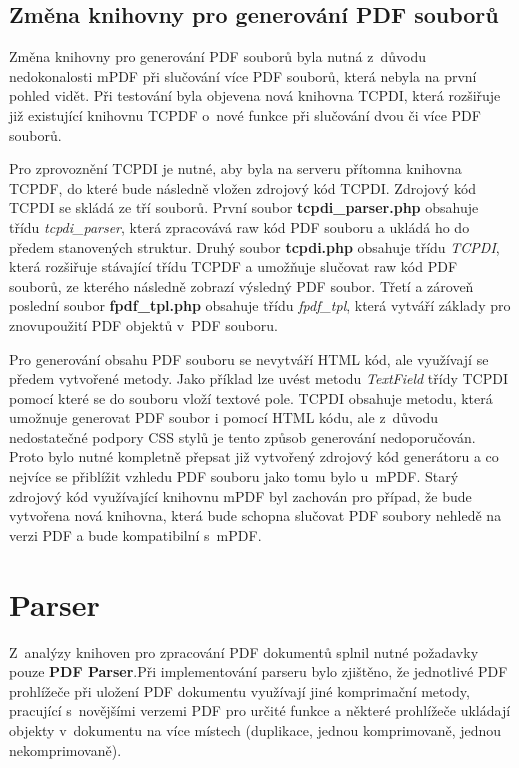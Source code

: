 \subsection{Změna knihovny pro generování PDF souborů}
Změna knihovny pro generování PDF souborů byla nutná z~důvodu nedokonalosti mPDF při slučování více PDF souborů, která nebyla na první pohled vidět. Při testování byla objevena nová knihovna TCPDI, která rozšiřuje již existující knihovnu TCPDF o~nové funkce při slučování dvou či více PDF souborů. 
\par
Pro zprovoznění TCPDI je nutné, aby byla na serveru přítomna knihovna TCPDF, do které bude následně vložen zdrojový kód TCPDI. Zdrojový kód TCPDI se skládá ze tří souborů. První soubor \textbf{tcpdi\_parser.php} obsahuje třídu \textit{tcpdi\_parser}, která zpracovává raw kód PDF souboru a ukládá ho do předem stanovených struktur. Druhý soubor \textbf{tcpdi.php} obsahuje třídu \textit{TCPDI}, která rozšiřuje stávající třídu TCPDF a umožňuje slučovat raw kód PDF souborů, ze kterého následně zobrazí výsledný PDF soubor. Třetí a zároveň poslední soubor \textbf{fpdf\_tpl.php} obsahuje třídu \textit{fpdf\_tpl}, která vytváří základy pro znovupoužití PDF objektů v~PDF souboru.
\par
Pro generování obsahu PDF souboru se nevytváří HTML kód, ale využívají se předem vytvořené metody. Jako příklad lze uvést metodu \textit{TextField} třídy TCPDI pomocí které se do souboru vloží textové pole. TCPDI obsahuje metodu, která umožnuje generovat PDF soubor i pomocí HTML kódu, ale z~důvodu nedostatečné podpory CSS stylů je tento způsob generování nedoporučován. Proto bylo nutné kompletně přepsat již vytvořený zdrojový kód generátoru a co nejvíce se přiblížit vzhledu PDF souboru jako tomu bylo u~mPDF. Starý zdrojový kód využívající knihovnu mPDF byl zachován pro případ, že bude vytvořena nová knihovna, která bude schopna slučovat PDF soubory nehledě na verzi PDF a bude kompatibilní s~mPDF. 

\section{Parser}
Z~analýzy knihoven pro zpracování PDF dokumentů splnil nutné požadavky pouze \textbf{PDF Parser}.Při implementování parseru bylo zjištěno, že jednotlivé PDF prohlížeče při uložení PDF dokumentu využívají jiné komprimační metody, pracující s~novějšími verzemi PDF pro určité funkce a některé prohlížeče ukládají objekty v~dokumentu na více místech (duplikace, jednou komprimovaně, jednou nekomprimovaně).

